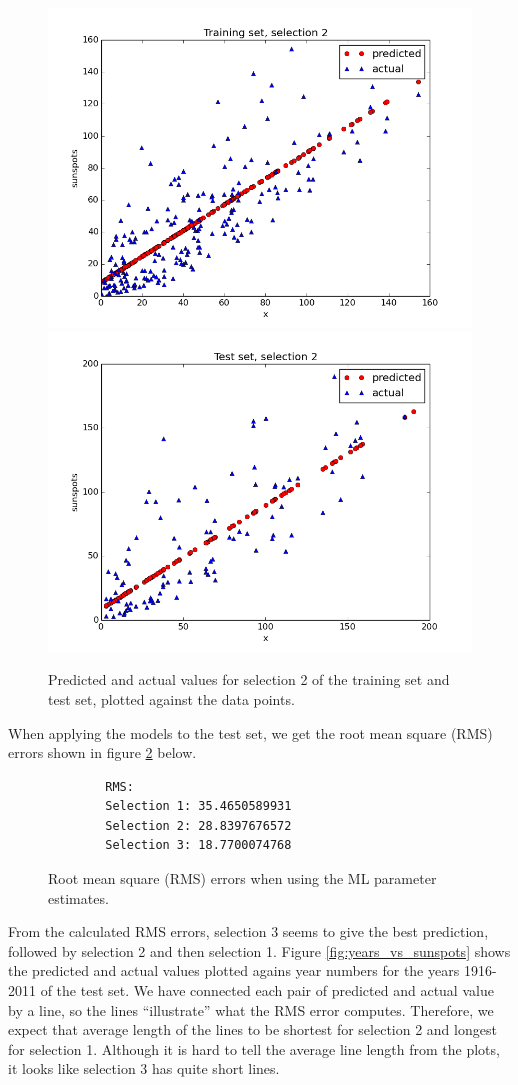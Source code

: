 \documentclass[a4paper]{article}
\begin{document}
\begin{figure}[H]
  \begin{adjustwidth}{-7em}{-7em}
    \centering
    \includegraphics[width=.47\linewidth]{figures/training_set_selection2.png}
    \includegraphics[width=.47\linewidth]{figures/test_set_selection2.png}
  \end{adjustwidth}
  \caption{Predicted and actual values for selection 2 of the training set and test set, plotted against the data points.}
  \label{fig:selection2}
\end{figure}

When applying the models to the test set, we get the root mean square (RMS) errors shown in figure \ref{fig:rms_ml} below.

\begin{figure}[H]
	\begin{lstlisting}
        RMS:
        Selection 1: 35.4650589931
        Selection 2: 28.8397676572
        Selection 3: 18.7700074768
	\end{lstlisting}
	\caption{Root mean square (RMS) errors when using the ML parameter estimates.}
	\label{fig:rms_ml}
\end{figure}

From the calculated RMS errors, selection 3 seems to give the best prediction, followed by selection 2 and then selection 1. Figure \ref{fig:years_vs_sunspots} shows the predicted and actual values plotted agains year numbers for the years 1916-2011 of the test set. We have connected each pair of predicted and actual value by a line, so the lines ``illustrate'' what the RMS error computes. Therefore, we expect that average length of the lines to be shortest for selection 2 and longest for selection 1. Although it is hard to tell the average line length from the plots, it looks like selection 3 has quite short lines.
\end{document}

